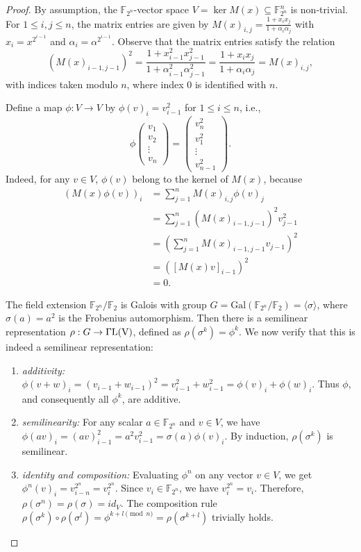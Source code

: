 \documentclass[hidelinks,onefignum,onetabnum]{siamart251216}
\theoremstyle{definition}
\theoremstyle{remark}
\begin{document}
\begin{proof}
	By assumption, the $\mathbb{F}_{2^n}$-vector space $V = \ker M(x) \subseteq \mathbb{F}_{2^n}^n$ is non-trivial. For $1 \le i, j \le n$, the matrix entries are given by $M(x)_{i,j} = \frac{1 + x_i x_j}{1 + \alpha_i \alpha_j}$ with $x_i = x^{2^{i-1}}$ and $\alpha_i = \alpha^{2^{i-1}}$. Observe that the matrix entries satisfy the relation
	$$
	(M(x)_{i-1, j-1})^2 = \frac{1+x_{i-1}^2 x_{j-1}^2}{1+\alpha_{i-1}^2 \alpha_{j-1}^2} = \frac{1+x_i x_j}{1+\alpha_i \alpha_j} = M(x)_{i,j},
	$$
	with indices taken modulo $n$, where index $0$ is identified with $n$. 
	
	Define a map $\phi: V \to V$ by $\phi(v)_i = v_{i-1}^2$ for $1 \le i \le n$, i.e., \[
	\phi\!
	\begin{pmatrix}
		v_1\\
		v_2\\
		\vdots\\
		v_n
	\end{pmatrix}
	=
	\begin{pmatrix}
		v_n^2\\
		v_1^2\\
		\vdots\\
		v_{n-1}^2
	\end{pmatrix}.
	\] Indeed, for any $v \in V$, $\phi(v)$ belong to the kernel of $M(x)$, because
	$$
	\begin{aligned}
		(M(x)\phi(v))_i &= \sum_{j=1}^n M(x)_{i,j} \phi(v)_j \\
		&= \sum_{j=1}^n \left( M(x)_{i-1, j-1} \right)^2 v_{j-1}^2 \\
		&= \left( \sum_{j=1}^n M(x)_{i-1, j-1} v_{j-1} \right)^2\\
		&=\left( [M(x)v]_{i-1} \right)^2\\
		&=0.
	\end{aligned}
	$$
	
	
	The field extension $\mathbb{F}_{2^n}/\mathbb{F}_2$ is Galois with group $G = \mathrm{Gal}(\mathbb{F}_{2^n}/\mathbb{F}_2) = \langle \sigma \rangle$, where $\sigma(a) = a^2$ is the Frobenius automorphism. Then there is a semilinear representation  $\rho : G\to \Gamma\rm{L}(V)$, defined as $\rho(\sigma^k)= \phi^{k}$. We now verify that this is indeed a semilinear representation:
	\begin{enumerate}
		\item \textit{additivity:}  $\phi(v+w)_i = (v_{i-1}+w_{i-1})^2 = v_{i-1}^2 + w_{i-1}^2 = \phi(v)_i + \phi(w)_i$. Thus $\phi$, and consequently all $\phi^k$, are additive.
		\item\textit{semilinearity:} For any scalar $a \in \mathbb{F}_{2^n}$ and $v \in V$, we have $\phi(av)_i = (av)_{i-1}^2 = a^2 v_{i-1}^2 = \sigma(a)\phi(v)_i$. By induction, $\rho(\sigma^k)$ is semilinear.
		\item \textit{identity and composition:} Evaluating $\phi^n$ on any vector $v \in V$, we get $\phi^n(v)_i = v_{i-n}^{2^n} = v_i^{2^n}$. Since $v_i \in \mathbb{F}_{2^n}$, we have $v_i^{2^n} = v_i$. Therefore, $\rho(\sigma^n)= \rho(\sigma) = id_V$. The composition rule $\rho(\sigma^k) \circ \rho(\sigma^l) = \phi^{k+l \pmod n} = \rho(\sigma^{k+l})$ trivially holds.
	\end{enumerate}
	

\end{proof}
\end{document}
